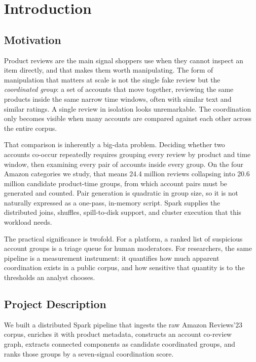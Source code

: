 \documentclass[12pt]{article}
\begin{document}
\section{Introduction}

\subsection{Motivation}

Product reviews are the main signal shoppers use when they cannot inspect an
item directly, and that makes them worth manipulating. The form of
manipulation that matters at scale is not the single fake review but the
\emph{coordinated group}: a set of accounts that move together, reviewing the
same products inside the same narrow time windows, often with similar text and
similar ratings. A single review in isolation looks unremarkable. The
coordination only becomes visible when many accounts are compared against each
other across the entire corpus.

That comparison is inherently a big-data problem. Deciding whether two accounts
co-occur repeatedly requires grouping every review by product and time window,
then examining every pair of accounts inside every group. On the four Amazon
categories we study, that means 24.4 million reviews collapsing into 20.6
million candidate product-time groups, from which account pairs must be
generated and counted. Pair generation is quadratic in group size, so it is
not naturally expressed as a one-pass, in-memory script. Spark supplies the
distributed joins, shuffles, spill-to-disk support, and cluster execution that
this workload needs.

The practical significance is twofold. For a platform, a ranked list of
suspicious account groups is a triage queue for human moderators. For
researchers, the same pipeline is a measurement instrument: it quantifies how
much apparent coordination exists in a public corpus, and how sensitive that
quantity is to the thresholds an analyst chooses.

\subsection{Project Description}

We built a distributed Spark pipeline that ingests the raw Amazon Reviews'23
corpus, enriches it with product metadata, constructs an account co-review
graph, extracts connected components as candidate coordinated groups, and
ranks those groups by a seven-signal coordination score.
\end{document}
